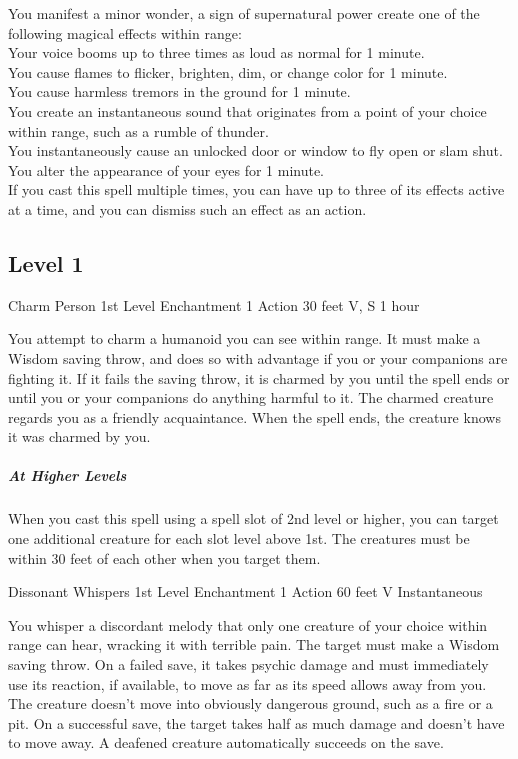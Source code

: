 \documentclass[letterpaper,openany,oneside,twocolumn]{book}
\begin{document}
You manifest a minor wonder, a sign of supernatural power create one of the following magical effects within range:\\
Your voice booms up to three times as loud as normal for 1 minute.\\
You cause flames to flicker, brighten, dim, or change color for 1 minute.\\
You cause harmless tremors in the ground for 1 minute.\\
You create an instantaneous sound that originates from a point of your choice within range, such as a rumble of thunder.\\
You instantaneously cause an unlocked door or window to fly open or slam shut.\\
You alter the appearance of your eyes for 1 minute.\\
If you cast this spell multiple times, you can have up to three of its effects active at a time, and you can dismiss such an effect as an action.\\

\subsection*{Level 1}

\DndSpellHeader
  {Charm Person}
  {1st Level Enchantment}
  {1 Action}
  {30 feet}
  {V, S}
  {1 hour}

You attempt to charm a humanoid you can see within range. It must make a Wisdom saving throw, and does so with advantage if you or your companions are fighting it. If it fails the saving throw, it is charmed by you until the spell ends or until you or your companions do anything harmful to it. The charmed creature regards you as a friendly acquaintance. When the spell ends, the creature knows it was charmed by you.

\subparagraph*{At Higher Levels} When you cast this spell using a spell slot of 2nd level or higher, you can target one additional creature for each slot level above 1st. The creatures must be within 30 feet of each other when you target them.

\DndSpellHeader
  {Dissonant Whispers}
  {1st Level Enchantment}
  {1 Action}
  {60 feet}
  {V}
  {Instantaneous}

You whisper a discordant melody that only one creature of your choice within range can hear, wracking it with terrible pain. The target must make a Wisdom saving throw. On a failed save, it takes  psychic damage and must immediately use its reaction, if available, to move as far as its speed allows away from you. The creature doesn’t move into obviously dangerous ground, such as a fire or a pit. On a successful save, the target takes half as much damage and doesn’t have to move away. A deafened creature automatically succeeds on the save.
\end{document}
